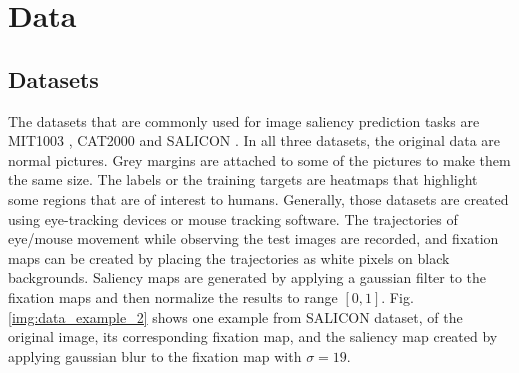 \documentclass[12pt]{article}
\begin{document}
\section{Data}
\subsection{Datasets}
\label{sec:datasets}
The datasets that are commonly used for image saliency prediction tasks are MIT1003 \cite{judd2012benchmark}, CAT2000 \cite{borji2015cat2000} and SALICON \cite{jiang2015salicon}.
In all three datasets, the original data are normal pictures. Grey margins are attached to some of the pictures to make them the same size. 
The labels or the training targets are heatmaps that highlight some regions that are of interest to humans.
Generally, those datasets are created using eye-tracking devices or mouse tracking software. The trajectories of eye/mouse movement while
observing the test images are recorded, and fixation maps can be created
by placing the trajectories as white pixels on black backgrounds. Saliency maps are generated by
applying a gaussian filter to the fixation maps and then normalize the results to range $[0, 1]$.
Fig. \ref{img:data_example_2} shows one example from SALICON dataset, of the original image, its corresponding 
fixation map, and the saliency map created by applying gaussian blur to the fixation map with $\sigma=19$.
\end{document}

